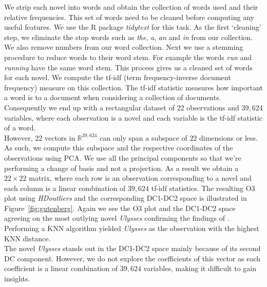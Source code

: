\documentclass[a4paper,11pt]{article}
\begin{document}
We strip each novel into words and obtain the collection of words used and their relative frequencies. This set of words need to be cleaned before computing any useful features. We use the R package \textit{tidytext} \citep{tidytext} for this task. As the first `cleaning' step, we eliminate the stop words such as \textit{the}, \textit{a}, \textit{an} and \textit{in} from our collection. We also remove numbers from our word collection.  Next we use a stemming procedure to reduce words to their word stem. For example the words \textit{run} and \textit{running} have the same word stem. This process gives us a cleaned set of words for each novel. We compute the tf-idf (term frequency-inverse document frequency) measure on this collection. The tf-idf statistic measures how important a word is to a document when considering a collection of documents.  Consequently we end up with a rectangular dataset of $22$ observations and $39,624$ variables, where each observation is a novel and each variable is the tf-idf statistic of a word. \\

However, $22$ vectors in $\mathbb{R}^{39,624}$ can only span a subspace of $22$ dimensions or less. As such, we compute this subspace and the respective coordinates of the observations using PCA. We use all the principal components so that we're  performing a change of basis and not a projection. As a result we obtain a $22\times 22$ matrix, where each row is an observation corresponding to a novel and each column is a linear combination of $39,624$ tf-idf statistics. The resulting O3 plot using \textit{HDoutliers} and the corresponding DC1-DC2 space is illustrated in Figure~\ref{fig:gutenberg}. Again we see the O3 plot and the DC1-DC2 space agreeing on the most outlying novel \textit{Ulysses} confirming the findings of \cite{wilkinson2017visualizing}. Performing a KNN algorithm yielded \textit{Ulysses} as the observation with the highest KNN distance.  \\

The novel \textit{Ulysses} stands out in the DC1-DC2 space mainly because of its second DC component. However, we do not explore the coefficients of this vector as each coefficient is a linear combination of  $39,624$ variables, making it difficult to gain insights. \\
\end{document}
